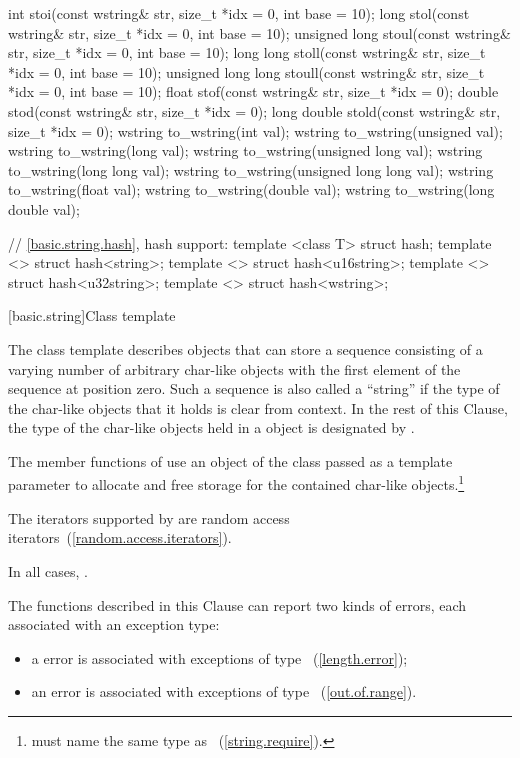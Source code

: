 \begin{codeblock}
{  int stoi(const wstring& str, size_t *idx = 0, int base = 10);
  long stol(const wstring& str, size_t *idx = 0, int base = 10);
  unsigned long stoul(const wstring& str, size_t *idx = 0, int base = 10);
  long long stoll(const wstring& str, size_t *idx = 0, int base = 10);
  unsigned long long stoull(const wstring& str, size_t *idx = 0, int base = 10);
  float stof(const wstring& str, size_t *idx = 0);
  double stod(const wstring& str, size_t *idx = 0);
  long double stold(const wstring& str, size_t *idx = 0);
  wstring to_wstring(int val);
  wstring to_wstring(unsigned val);
  wstring to_wstring(long val);
  wstring to_wstring(unsigned long val);
  wstring to_wstring(long long val);
  wstring to_wstring(unsigned long long val);
  wstring to_wstring(float val);
  wstring to_wstring(double val);
  wstring to_wstring(long double val);

  // \ref{basic.string.hash}, hash support:
  template <class T> struct hash;
  template <> struct hash<string>;
  template <> struct hash<u16string>;
  template <> struct hash<u32string>;
  template <> struct hash<wstring>;
}
\end{codeblock}

[basic.string]{Class template }

\pnum
{}%
The
class template
describes objects that can store a sequence consisting of a varying number of
arbitrary char-like objects with the first element of the sequence at position zero.
Such a sequence is also called a ``string'' if the type of the
char-like objects that it holds
is clear from context.
In the rest of this Clause,
the type of the char-like objects held in a  object
is designated by .

\pnum
The
member functions of
 use an object of the
class passed as a template parameter to allocate and free storage for the
contained char-like objects.\footnote{ must name the same type
as ~(\ref{string.require}).}

\pnum
The iterators supported by
 are random access iterators~(\ref{random.access.iterators}).

\pnum
In all cases,
.

\pnum
The functions described in this Clause can report two
kinds of errors, each associated with an exception type:

\begin{itemize}
\item
a
error is associated with exceptions of type
~(\ref{length.error});
%
\item
an
error is associated with exceptions of type
~(\ref{out.of.range}).
%
\end{itemize}

